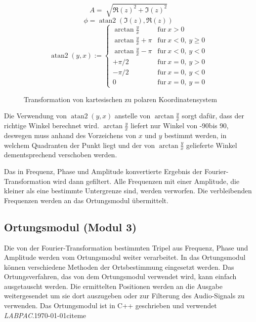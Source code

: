 \begin{minipage}{0.49\textwidth}
  $$
  A = \sqrt[]{{\Re(z)}^2 + {\Im(z)}^2}
  $$
  $$
  \phi = \operatorname{atan2}(\Im(z), \Re(z))
  $$
  $$
  \operatorname{atan2}(y,x) := \begin{cases} \arctan\frac{y}{x} & \mathrm{f\ddot ur}\ x > 0\\ \arctan\frac{y}{x} + \pi & \mathrm{f\ddot ur}\ x < 0,\ y \geq 0\\ \arctan\frac{y}{x} - \pi & \mathrm{f\ddot ur}\ x < 0,\ y < 0\\ +\pi/2 & \mathrm{f\ddot ur}\ x = 0,\ y > 0\\ -\pi/2 & \mathrm{f\ddot ur}\ x = 0,\ y < 0\\ 0 & \mathrm{f\ddot ur}\ x = 0,\ y = 0 \end{cases}
  $$
\end{minipage}
\begin{minipage}{0.49\textwidth}
  \begin{figure}[H]
    \centering
    \scalebox{.6}{}
    \caption{Transformation von kartesischen zu polaren Koordinatensystem}
    \label{fig:polarconvert}
  \end{figure}
\end{minipage}
Die Verwendung von $\operatorname{atan2}(y,x)$ anstelle von $\arctan\frac{y}{x}$ sorgt dafür, dass der richtige Winkel berechnet wird. $\arctan\frac{y}{x}$ liefert nur Winkel von -90\degree bis 90\degree, deswegen muss anhand des Vorzeichens von $x$ und $y$ bestimmt werden, in welchem Quadranten der Punkt liegt und der von $\arctan\frac{y}{x}$ gelieferte Winkel dementsprechend verschoben werden.

Das in Frequenz, Phase und Amplitude konvertierte Ergebnis der Fourier-Transformation wird dann gefiltert. Alle Frequenzen mit einer Amplitude, die kleiner als eine bestimmte Untergrenze sind, werden verworfen. Die verbleibenden Frequenzen werden an das Ortungsmodul übermittelt.

\subsection{Ortungsmodul (Modul 3)}
Die von der Fourier-Transformation bestimmten Tripel aus Frequenz, Phase und Amplitude werden vom Ortungsmodul weiter verarbeitet. In das Ortungsmodul können verschiedene Methoden der Ortsbestimmung eingesetzt werden. Das Ortungsverfahren, das von dem Ortungsmodul verwendet wird, kann einfach ausgetauscht werden. Die ermittelten Positionen werden an die Ausgabe weitergesendet um sie dort auszugeben oder zur Filterung des Audio-Signals zu verwenden.
Das Ortungsmodul ist in C++ geschrieben und verwendet \textit{LABPAC}.\today{citeme}
